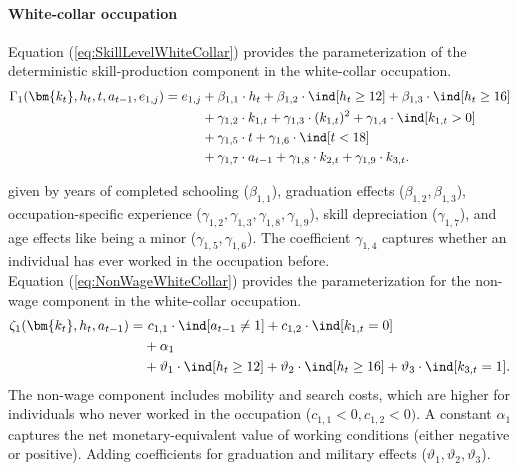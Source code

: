 \paragraph{White-collar occupation} Equation (\ref{eq:SkillLevelWhiteCollar}) provides the parameterization of the deterministic skill-production component in the white-collar occupation.
%
\begin{align}\label{eq:SkillLevelWhiteCollar}
    \Gamma_1(\bm{k_t}, h_t, t, a_{t-1}, e_{1,j}) = e_{1,j} & + \beta_{1,1} \cdot h_t + \beta_{1, 2} \cdot \ind[h_t \geq 12] + \beta_{1,3} \cdot \ind[h_t\geq 16] \nonumber\\
                                 \nonumber & + \gamma_{1, 2} \cdot  k_{1,t} + \gamma_{1,3} \cdot  (k_{1,t})^2 + \gamma_{1,4} \cdot  \ind[k_{1,t} > 0] \\
                                  \nonumber & + \gamma_{1,5} \cdot  t + \gamma_{1,6} \cdot \ind[t < 18] \nonumber\\
                                  & + \gamma_{1,7} \cdot  a_{t-1} + \gamma_{1,8} \cdot  k_{2,t} + \gamma_{1,9} \cdot  k_{3,t}.
\end{align}
%

given by years of completed schooling ($\beta_{1,1}$), graduation effects ($\beta_{1,2}, \beta_{1,3}$), occupation-specific experience ($\gamma_{1,2}, \gamma_{1,3},  \gamma_{1,8}, \gamma_{1,9}$), skill depreciation ($\gamma_{1,7}$), and age effects like being a minor ($\gamma_{1,5}, \gamma_{1,6}$). The coefficient $\gamma_{1,4}$ captures whether an individual has ever worked in the occupation before.\\

Equation (\ref{eq:NonWageWhiteCollar}) provides the parameterization for the non-wage component in the white-collar occupation.
%
\begin{align}\label{eq:NonWageWhiteCollar}
\zeta_{1}(\bm{k_t}, h_t, a_{t-1}) = &~c_{1,1} \cdot \ind[a_{t-1} \neq 1] + c_{1,2} \cdot \ind[k_{1,t} = 0] \nonumber \\
                            & + \alpha_1 \nonumber \\
                            & + \vartheta_1 \cdot \ind[h_t \geq 12] + \vartheta_2 \cdot \ind[h_t \geq 16] + \vartheta_3 \cdot \ind[k_{3,t} = 1].
\end{align}
%
The non-wage component includes mobility and search costs, which are higher for individuals who never worked in the occupation ($c_{1,1} < 0, c_{1,2}< 0)$. A constant $\alpha_1$ captures the net monetary-equivalent value of working conditions (either negative or positive). Adding coefficients for graduation and military effects ($\vartheta_{1}, \vartheta_{2}, \vartheta_{3}$).

